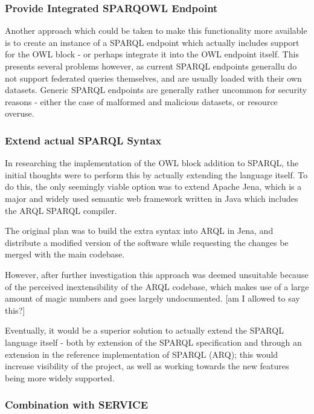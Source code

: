\documentclass{article}
\begin{document}
\subsubsection{Provide Integrated SPARQOWL Endpoint}

Another approach which could be taken to make this functionality more available
is to create an instance of a SPARQL endpoint which actually includes support
for the OWL block - or perhaps integrate it into the OWL endpoint itself. This
presents several problems however, as current SPARQL endpoints generallu do not
support federated queries themselves, and are usually loaded with their own
datasets. Generic SPARQL endpoints are generally rather uncommon for security
reasons - either the case of malformed and malicious datasets, or resource
overuse.

\subsubsection{Extend actual SPARQL Syntax}

In researching the implementation of the OWL block addition to SPARQL, the
initial thoughts were to perform this by actually extending the language itself.
To do this, the only seemingly viable option was to extend Apache Jena, which is
a major and widely used semantic web framework written in Java which includes the 
ARQL SPARQL compiler. 

The original plan was to build the extra syntax into ARQL in Jena, and
distribute a modified version of the software while requesting the changes be
merged with the main codebase.

However, after further investigation this approach was deemed unsuitable because
of the perceived inextensibility of the ARQL codebase, which makes use of a
large amount of magic numbers and goes largely undocumented. [am I allowed to
say this?]

Eventually, it would be a superior solution to actually extend the SPARQL
language itself - both by extension of the SPARQL
specification and through an extension in the reference implementation of SPARQL
(ARQ); this would increase visibility of the
project, as well as working towards the new features being more widely
supported.

\subsubsection{Combination with SERVICE}
\end{document}
